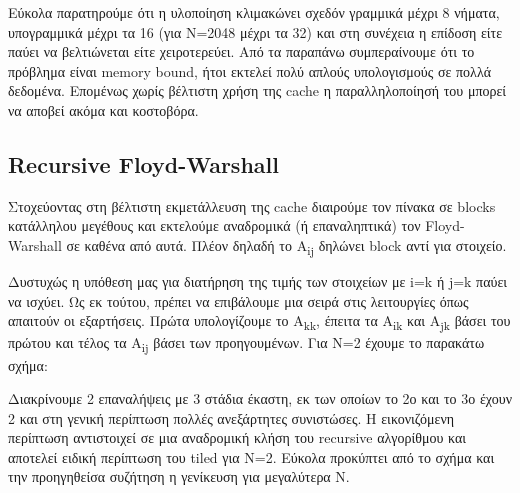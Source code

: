 \documentclass[12pt,titlepage]{article}
\begin{document}
Εύκολα παρατηρούμε ότι η υλοποίηση κλιμακώνει σχεδόν γραμμικά μέχρι 8 νήματα,
υπογραμμικά μέχρι τα 16 (για N=2048 μέχρι τα 32) και στη συνέχεια η επίδοση είτε
παύει να βελτιώνεται είτε χειροτερεύει. Από τα παραπάνω συμπεραίνουμε ότι το
πρόβλημα είναι memory bound, ήτοι εκτελεί πολύ απλούς υπολογισμούς σε πολλά
δεδομένα. Επομένως χωρίς βέλτιστη χρήση της cache η παραλληλοποίησή του μπορεί
να αποβεί ακόμα και κοστοβόρα.

\newpage

\subsection{Recursive Floyd-Warshall}

Στοχεύοντας στη βέλτιστη εκμετάλλευση της cache διαιρούμε τον πίνακα σε blocks
κατάλληλου μεγέθους και εκτελούμε αναδρομικά (ή επαναληπτικά) τον
Floyd-Warshall σε καθένα από αυτά. Πλέον δηλαδή το A\textsubscript{ij}
δηλώνει block αντί για στοιχείο.

Δυστυχώς η υπόθεση μας για διατήρηση της τιμής των στοιχείων με i=k ή j=k παύει
να ισχύει. Ως εκ τούτου, πρέπει να επιβάλουμε μια σειρά στις λειτουργίες όπως
απαιτούν οι εξαρτήσεις. Πρώτα υπολογίζουμε το A\textsubscript{kk}, έπειτα τα
A\textsubscript{ik} και Α\textsubscript{jk} βάσει του πρώτου και τέλος τα
A\textsubscript{ij} βάσει των προηγουμένων. Για N=2 έχουμε το παρακάτω σχήμα:

\begin{center}
\end{center}

Διακρίνουμε 2 επαναλήψεις με 3 στάδια έκαστη, εκ των οποίων το 2ο και το 3ο
έχουν 2 και στη γενική περίπτωση πολλές ανεξάρτητες συνιστώσες. Η εικονιζόμενη
περίπτωση αντιστοιχεί σε μια αναδρομική κλήση του recursive αλγορίθμου και
αποτελεί ειδική περίπτωση του tiled για N=2. Εύκολα προκύπτει από το σχήμα και
την προηγηθείσα συζήτηση η γενίκευση για μεγαλύτερα N.
\end{document}

